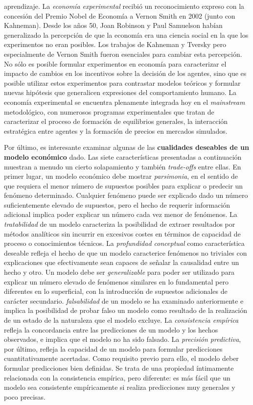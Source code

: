 \documentclass{nuevotema}
\begin{document}
aprendizaje. La \textit{economía experimental} recibió un reconocimiento expreso con la concesión del Premio Nobel de Economía a Vernon Smith en 2002 (junto con Kahneman). Desde los años 50, Joan Robinson y Paul Samuelson habían generalizado la percepción de que la economía era una ciencia social en la que los experimentos no eran posibles. Los trabajos de Kahneman y Tversky pero especialmente de Vernon Smith fueron esenciales para cambiar esta percepción. No sólo es posible formular experimentos en economía para caracterizar el impacto de cambios en los incentivos sobre la decisión de los agentes, sino que es posible utilizar estos experimentos para contrastar modelos teóricos y formular nuevas hipótesis que generalicen expresiones del comportamiento humano. La economía experimental se encuentra plenamente integrada hoy en el \textit{mainstream} metodológico, con numerosos programas experimentales que tratan de caracterizar el proceso de formación de equilibrios generales, la interacción estratégica entre agentes y la formación de precios en mercados simulados. 

Por último, es interesante examinar algunas de las \textbf{cualidades deseables de un modelo económico} dado. Las siete características presentadas a continuación muestran a menudo un cierto solapamiento y también \textit{trade-offs} entre ellas. En primer lugar, un modelo económico debe mostrar \textit{parsimonia}, en el sentido de que requiera el menor número de supuestos posibles para explicar o predecir un fenómeno determinado. Cualquier fenómeno puede ser explicado dado un número suficientemente elevado de supuestos, pero el hecho de requerir información adicional implica poder explicar un número cada vez menor de fenómenos. La \textit{tratabilidad} de un modelo caracteriza la posibilidad de extraer resultados por métodos analíticos sin incurrir en excesivos costes en términos de capacidad de proceso o conocimientos técnicos. La \textit{profundidad conceptual} como característica deseable refleja el hecho de que un modelo caracterice fenómenos no triviales con explicaciones que efectivamente sean capaces de señalar la causalidad entre un hecho y otro. Un modelo debe ser \textit{generalizable} para poder ser utilizado para explicar un número elevado de fenómenos similares en lo fundamental pero diferentes en lo superficial, con la introducción de supuestos adicionales de carácter secundario. \textit{falsabilidad} de un modelo se ha examinado anteriormente e implica la posibilidad de probar falso un modelo como resultado de la realización de un estado de la naturaleza que el modelo excluye. La \textit{consistencia empírica} refleja la concordancia entre las predicciones de un modelo y los hechos observados, e implica que el modelo no ha sido falsado. La \textit{precisión predictiva}, por último, refleja la capacidad de un modelo para formular predicciones cuantitativamente acertadas. Como requisito previo para ello, el modelo deber formular predicciones bien definidas. Se trata de una propiedad íntimamente relacionada con la consistencia empírica, pero diferente: es más fácil que un modelo sea consistente empíricamente si realiza predicciones muy generales y poco precisas.
\end{document}
